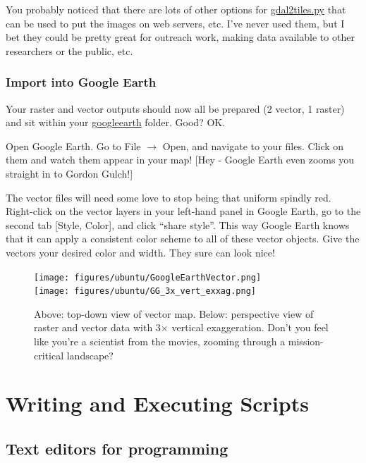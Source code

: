 \documentclass{book}
\begin{document}
You probably noticed that there are lots of other options for \url{gdal2tiles.py} that can be used to put the images on web servers, etc. I've never used them, but I bet they could be pretty great for outreach work, making data available to other researchers or the public, etc.

\subsection{Import into Google Earth}

Your raster and vector outputs should now all be prepared (2 vector, 1 raster) and sit within your \url{googleearth} folder. Good? OK.

Open Google Earth. Go to File $\rightarrow$ Open, and navigate to your files. Click on them and watch them appear in your map! [Hey - Google Earth even zooms you straight in to Gordon Gulch!]

The vector files will need some love to stop being that uniform spindly red. Right-click on the vector layers in your left-hand panel in Google Earth, go to the second tab [Style, Color], and click ``share style''. This way Google Earth knows that it can apply a consistent color scheme to all of these vector objects. Give the vectors your desired color and width. They sure can look nice!

\begin{figure}[h]
 \begin{center}
 \texttt{[image: figures/ubuntu/GoogleEarthVector.png]} \\
 \vspace{5mm}
 \texttt{[image: figures/ubuntu/GG\_3x\_vert\_exxag.png]}
 \caption{Above: top-down view of vector map. Below: perspective view of raster and vector data with 3$\times$ vertical exaggeration. Don't you feel like you're a scientist from the movies, zooming through a mission-critical landscape?}
 \label{fig:GoogleEarthGordonGulch}
 \end{center}
\end{figure}

\chapter{Writing and Executing Scripts \label{s:scripts}}

\section{Text editors for programming}
\end{document}
